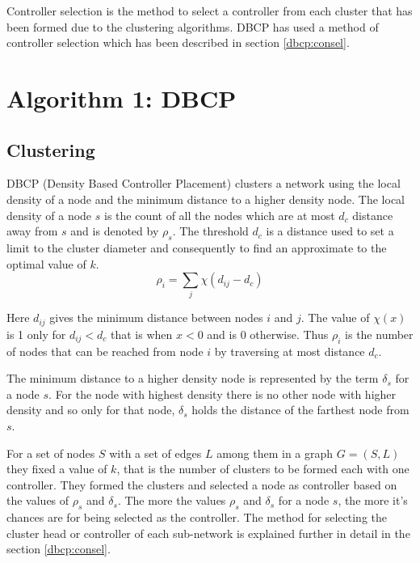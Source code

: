 \documentclass[10pt]{extarticle}
\begin{document}
	Controller selection is the method to select a controller from each cluster that has been formed due to the clustering algorithms. DBCP has used a method of controller selection which has been described in section \ref{dbcp:consel}.
	
	\section{Algorithm 1: DBCP\cite{dbcp}} \label{algo:dbcp}

	\subsection{Clustering} \label{dbcp:cluster}
	DBCP (Density Based Controller Placement) clusters a network using the local density of a node and the minimum distance to a higher density node. The local density of a node $s$ is the count of all the nodes which are at most $d_c$ distance away from $s$ and is denoted by $\rho_s$. The threshold $d_c$ is a distance used to set a limit to the cluster diameter and consequently to find an approximate to the optimal value of $k$.
	\begin{equation}
	\rho_i=\sum_j\chi(d_{ij}-d_c)
	\end{equation}
	
	Here $d_{ij}$ gives the minimum distance between nodes $i$ and $j$. The value of $\chi(x)$ is 1 only for $d_{ij}<d_c$ that is when $x<0$ and is 0 otherwise. Thus $\rho_i$ is the number of nodes that can be reached from node $i$ by traversing at most distance $d_c$.
	
	The minimum distance to a higher density node is represented by the term $\delta_s$ for a node $s$. For the node with highest density there is no other node with higher density and so only for that node, $\delta_s$ holds the distance of the farthest node from $s$.
	
	For a set of nodes $S$ with a set of edges $L$ among them in a graph $G=(S,L)$ they fixed a value of $k$, that is the number of clusters to be formed each with one controller. They formed the clusters and selected a node as controller based on the values of $\rho_s$ and $\delta_s$. The more the values $\rho_s$ and $\delta_s$ for a node $s$, the more it's chances are for being selected as the controller. The method for selecting the cluster head or controller of each sub-network is explained further in detail in the section \ref{dbcp:consel}.
	
\end{document}
